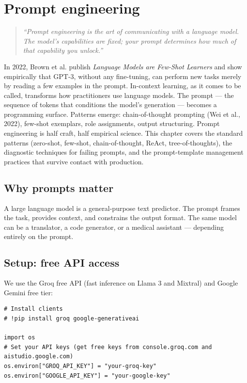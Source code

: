 \chapter{Prompt engineering}
\label{ch:prompt-engineering}

\begin{quote}
\emph{``Prompt engineering is the art of communicating with a language model. The model's capabilities are fixed; your prompt determines how much of that capability you unlock.''}
\end{quote}

In 2022, Brown et al. publish \emph{Language Models are Few-Shot Learners} and show empirically that GPT-3, without any fine-tuning, can perform new tasks merely by reading a few examples in the prompt. In-context learning, as it comes to be called, transforms how practitioners use language models. The prompt --- the sequence of tokens that conditions the model's generation --- becomes a programming surface. Patterns emerge: chain-of-thought prompting (Wei et al., 2022), few-shot exemplars, role assignments, output structuring. Prompt engineering is half craft, half empirical science. This chapter covers the standard patterns (zero-shot, few-shot, chain-of-thought, ReAct, tree-of-thoughts), the diagnostic techniques for failing prompts, and the prompt-template management practices that survive contact with production.

\section{Why prompts matter}

A large language model is a general-purpose text predictor. The prompt frames the task, provides context, and constrains the output format. The same model can be a translator, a code generator, or a medical assistant --- depending entirely on the prompt.

\section{Setup: free API access}

We use the Groq free API (fast inference on Llama 3 and Mixtral) and Google Gemini free tier:

\begin{verbatim}
# Install clients
# !pip install groq google-generativeai

import os
# Set your API keys (get free keys from console.groq.com and aistudio.google.com)
os.environ["GROQ_API_KEY"] = "your-groq-key"
os.environ["GOOGLE_API_KEY"] = "your-google-key"
\end{verbatim}

